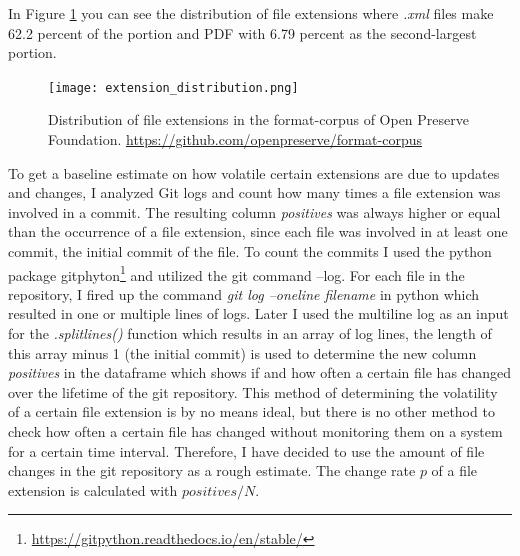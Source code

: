 In Figure \ref{fig:extension_distribution} you can see the distribution of file extensions where \textit{.xml} files make 62.2 percent of the portion and PDF with 6.79 percent as the second-largest portion.
\begin{figure}[t]
    \centering
    \texttt{[image: extension\_distribution.png]}
    \caption{Distribution of file extensions in the format-corpus of Open Preserve Foundation. \url{https://github.com/openpreserve/format-corpus}}
    \label{fig:extension_distribution}
\end{figure}
To get a baseline estimate on how volatile certain extensions are due to updates and changes, I analyzed Git logs and count how many times a file extension was involved in a commit. The resulting column \textit{positives} was always higher or equal than the occurrence of a file extension, since each file was involved in at least one commit, the initial commit of the file. To count the commits I used the python package gitphyton\footnote{\url{https://gitpython.readthedocs.io/en/stable/}} and utilized the git command --log. For each file in the repository, I fired up the command \textit{git log --oneline filename} in python which resulted in one or multiple lines of logs. Later I used the multiline log as an input for the \textit{.splitlines()} function which results in an array of log lines, the length of this array minus 1 (the initial commit) is used to determine the new column \textit{positives} in the dataframe which shows if and how often a certain file has changed over the lifetime of the git repository. 
This method of determining the volatility of a certain file extension is by no means ideal, but there is no other method to check how often a certain file has changed without monitoring them on a system for a certain time interval. Therefore, I have decided to use the amount of file changes in the git repository as a rough estimate.
The change rate $p$ of a file extension is calculated with $positives/N$.

